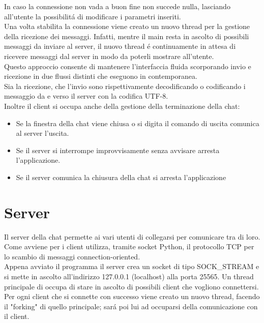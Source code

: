 \documentclass{article}
\begin{document}
In caso la connessione non vada a buon fine non succede nulla, lasciando all'utente la possibilit\'{a} di modificare i parametri inseriti.\\

Una volta stabilita la connessione viene creato un nuovo thread per la gestione della ricezione dei messaggi. 
Infatti, mentre il main resta in ascolto di possibili messaggi da inviare al server, il nuovo thread \'{e} continuamente in attesa di ricevere messaggi dal server in modo da poterli mostrare all'utente.\\

Questo approccio consente di mantenere l'interfaccia fluida scorporando invio e ricezione in due flussi distinti che eseguono in contemporanea.\\

Sia la ricezione, che l'invio sono rispettivamente decodificando o codificando i messaggio da e verso il server con la codifica UTF-8.\\

Inoltre il client si occupa anche della gestione della terminazione della chat:
\begin{itemize}
  \item Se la finestra della chat viene chiusa o si digita il comando di uscita comunica al server l'uscita.
  \item Se il server si interrompe improvvisamente senza avvisare arresta l'applicazione.
  \item Se il server comunica la chiusura della chat si arresta l'applicazione
\end{itemize}

\newpage

\section{Server}

Il server della chat permette ai vari utenti di collegarsi per comunicare tra di loro. 
Come avviene per i client utilizza, tramite socket Python, il protocollo TCP per lo scambio di messaggi connection-oriented.\\

Appena avviato il programma il server crea un socket di tipo SOCK\_STREAM e si mette in ascolto all'indirizzo 127.0.0.1 (localhost) alla porta 25565. 
Un thread principale di occupa di stare in ascolto di possibili client che vogliono connettersi.\\ 

Per ogni client che si connette con successo viene creato un nuovo thread, facendo il "forking" di quello principale; sar\'{a} poi lui ad occuparsi della comunicazione con il client.\\
\end{document}
